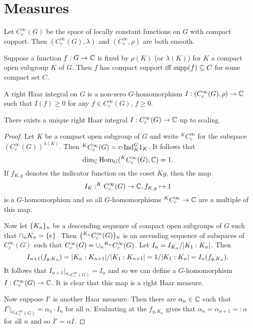 \documentclass{memoir}
\begin{document}
\section{Measures}
\begin{proposition}
    Let $C_c^\infty(G)$ be the space of locally constant functions on $G$ with compact support.
    Then $(C_c^\infty(G),\lambda)$ and $(C_c^\infty,\rho)$ are both smooth.
\end{proposition}
\begin{remark}
    Suppose a function $f:G\to \mathbb{C}$ is fixed by $\rho(K)$ (or $\lambda(K)$) for $K$ a compact open subgroup $K$ of $G$.
    Then $f$ has compact support iff $\text{supp}(f)\subseteq C$ for some compact set $C$.
\end{remark}
\begin{definition}
    A right Haar integral on $G$ is a non-zero $G$-homomorphism $I:(C_c^\infty(G),\rho)\to \mathbb{C}$ such that $I(f)\ge 0$ for any $f\in C_c^\infty(G)$, $f\ge 0$.
\end{definition}
\begin{thm}
    There exists a unique right Haar integral $I:C_c^\infty(G)\to \mathbb{C}$ up to scaling.
\end{thm}
\begin{proof}
    Let $K$ be a compact open subgroup of $G$ and write $^KC_c^\infty$ for the subspace $(C_c^\infty(G))^{\lambda(K)}$.
    Then $^KC_c^\infty(G) = \text{c-Ind}_K^G1_K$.
    It follows that
    \begin{equation}
        \dim_{\mathbb{C}}\operatorname{Hom}_G(^KC_c^\infty(G),\mathbb{C}) = 1.
    \end{equation}
    If $f_{K,g}$ denotes the indicator function on the coset $Kg$, then the map 
    \begin{equation}
        I_K:^KC_c^\infty(G)\to \mathbb{C}, f_{K,g}\mapsto 1
    \end{equation}
    is a $G$-homomorphism and so all $G$-homomorphisms $^KC_c^\infty\to \mathbb{C}$ are a multiple of this map.

    Now let $\lbrace K_n\rbrace_n$ be a descending sequence of compact open subgroups of $G$ such that $\cap_nK_n = \lbrace e\rbrace$.
    Then $\lbrace^{K_n}C_c^\infty(G)\rbrace_n$ is an ascending sequence of subspaces of $C_c^\infty(G)$ such that $C_c^\infty(G) = \cup_n \hphantom{ }^{K_n}C_c^\infty(G)$.
    Let $I_n = I_{K_n}/\lvert K_1:K_n\rvert$.
    Then 
    \begin{equation}
        I_{n+1}(f_{g,K_n}) = \lvert K_n:K_{n+1}\rvert/\lvert K_1:K_{n+1}\rvert = 1/\lvert K_1:K_n\rvert = I_n(f_{g,K_n}).
    \end{equation}
    It follows that $I_{n+1}|_{^{K_n}C_c^\infty(G)} = I_n$ and so we can define a $G$-homomorphism $I:C_c^\infty(G)\to \mathbb{C}$.
    It is clear that this map is a right Haar measure.

    Now suppose $I'$ is another Haar measure.
    Then there are $\alpha_n\in\mathbb{C}$ such that $I'|_{^{K_n}C_c^\infty(G)} = \alpha_n\cdot I_n$ for all $n$.
    Evaluating at the $f_{g,K_n}$ gives that $\alpha_n = \alpha_{n+1} =: \alpha$ for all $n$ and so $I' = \alpha I$.
\end{proof}
\end{document}
